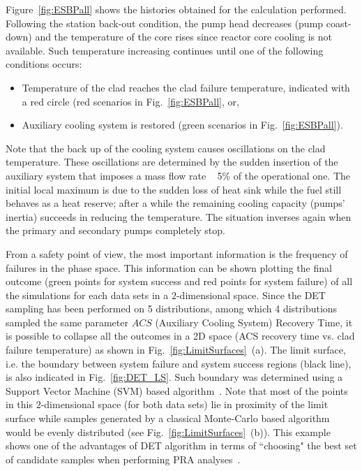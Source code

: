 Figure~\ref{fig:ESBPall} shows the histories obtained for the calculation performed.
Following the station back-out condition, the pump head decreases (pump coast-down) and the temperature of the core rises since reactor core cooling is not available. Such temperature increasing continues until one of the following conditions occurs:
\vspace{-5mm}
\begin{itemize}
\item Temperature of the clad reaches the clad failure temperature, indicated with a red circle (red scenarios in Fig.~\ref{fig:ESBPall}, or,
\item Auxiliary cooling system is restored (green scenarios in Fig.~\ref{fig:ESBPall}).
\end{itemize}
\vspace{-5mm}

Note that the back up of the cooling system causes oscillations on the clad temperature. These oscillations are determined by the sudden insertion of the auxiliary system that imposes a mass flow rate ~ 5\% of the operational one. The initial local maximum is due to the sudden loss of heat sink while the fuel still behaves as a heat reserve; after a while the remaining cooling capacity (pumps’ inertia) succeeds in reducing the temperature. The situation inverses again when the primary and secondary pumps completely stop. 

From a safety point of view, the most important information is the frequency of failures in the phase space. This information can be shown plotting the final outcome (green points for system success and red points for system failure) of all the simulations for each data sets in a $2$-dimensional space. Since the DET sampling has been performed on 5 distributions, among which 4 distributions sampled the same parameter $ACS$ (Auxiliary Cooling System) Recovery Time, it is possible to collapse all the outcomes in a 2D space (ACS recovery time vs. clad failure temperature) as shown in Fig.~\ref{fig:LimitSurfaces}~(a).
The limit surface, i.e. the boundary between system failure and system success regions (black line), is also indicated in Fig.~\ref{fig:DET_LS}. Such boundary was determined using a Support Vector Machine (SVM) based algorithm~\cite{mandelliANS_RISMC}.
Note that most of the points in this $2$-dimensional space (for both data sets) lie in proximity  of the limit surface while samples generated by a classical Monte-Carlo based algorithm would be evenly distributed (see Fig.~\ref{fig:LimitSurfaces}~(b)). 
This example shows one of the advantages of DET algorithm in terms of ``choosing" the best set of candidate samples when performing PRA analyses~\cite{alfonsiPSA}.

